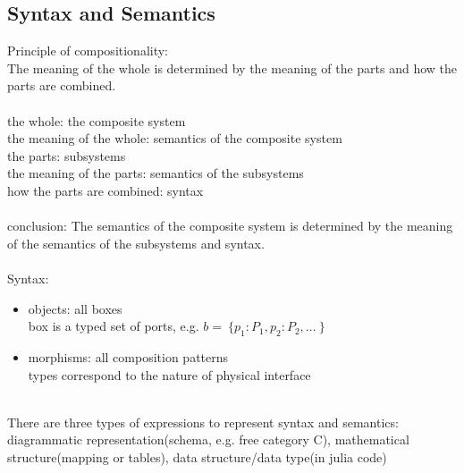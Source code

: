 \documentclass{article}
\begin{document}
\subsection{Syntax and Semantics}
Principle of compositionality:\\
The meaning of the whole is determined by the meaning of the parts and how the parts are combined.\\
\\
the whole: the composite system\\
the meaning of the whole: semantics of the composite system\\
the parts: subsystems\\
the meaning of the parts: semantics of the subsystems\\
how the parts are combined: syntax\\
\\
conclusion: The semantics of the composite system is determined by the meaning of the semantics of the subsystems and syntax.\\
\\
Syntax:
\begin{itemize}
    \item objects: all boxes\\
    box is a typed set of ports, e.g. $ b = ~\{p_1:P_1 , p_2:P_2 , \dots~\} $
    \item morphisms: all composition patterns\\
    types correspond to the nature of physical interface
\end{itemize}
\\
There are three types of expressions to represent syntax and semantics: diagrammatic representation(schema, e.g. free category C), mathematical structure(mapping or tables), data structure/data type(in julia code)
\\



\subsection{}


\subsection{}
\end{document}
